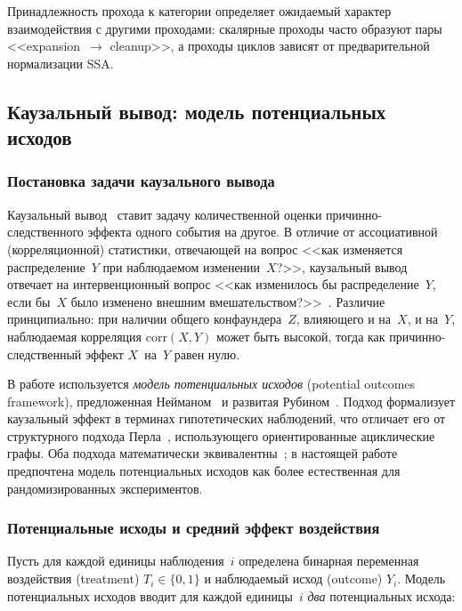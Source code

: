 Принадлежность прохода к категории определяет ожидаемый характер взаимодействия с другими проходами: скалярные проходы часто образуют пары <<expansion~$\to$ cleanup>>, а проходы циклов зависят от предварительной нормализации SSA.

\subsection{Каузальный вывод: модель потенциальных исходов}

\subsubsection{Постановка задачи каузального вывода}

Каузальный вывод~\cite{pearl2009causality, imbens2015causal, hernan2020} ставит задачу количественной оценки причинно-следственного эффекта одного события на другое. В отличие от ассоциативной (корреляционной) статистики, отвечающей на вопрос <<как изменяется распределение~$Y$ при наблюдаемом изменении~$X$?>>, каузальный вывод отвечает на интервенционный вопрос <<как изменилось бы распределение~$Y$, если бы~$X$ было изменено внешним вмешательством?>>~\cite{pearl2018book}. Различие принципиально: при наличии общего конфаундера~$Z$, влияющего и на~$X$, и на~$Y$, наблюдаемая корреляция $\mathrm{corr}(X, Y)$ может быть высокой, тогда как причинно-следственный эффект $X$~на~$Y$ равен нулю.

В работе используется \emph{модель потенциальных исходов} (potential outcomes framework), предложенная Нейманом~\cite{splawa1923} и развитая Рубином~\cite{rubin1974, imbens2015causal}. Подход формализует каузальный эффект в терминах гипотетических наблюдений, что отличает его от структурного подхода Перла~\cite{pearl2009overview}, использующего ориентированные ациклические графы. Оба подхода математически эквивалентны~\cite{pearl2010introduction}; в настоящей работе предпочтена модель потенциальных исходов как более естественная для рандомизированных экспериментов.

\subsubsection{Потенциальные исходы и средний эффект воздействия}

Пусть для каждой единицы наблюдения~$i$ определена бинарная переменная воздействия (treatment) $T_i \in \{0, 1\}$ и наблюдаемый исход (outcome) $Y_i$. Модель потенциальных исходов вводит для каждой единицы~$i$ \emph{два} потенциальных исхода:

